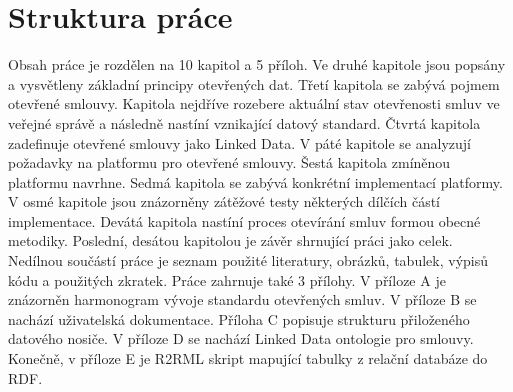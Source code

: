 \section{Struktura práce}

Obsah práce je rozdělen na 10 kapitol a 5 příloh. Ve druhé kapitole jsou popsány a vysvětleny základní principy otevřených dat. Třetí kapitola se zabývá pojmem otevřené smlouvy. Kapitola nejdříve rozebere aktuální stav otevřenosti smluv ve veřejné správě a následně nastíní vznikající datový standard. Čtvrtá kapitola zadefinuje otevřené smlouvy jako Linked Data. V páté kapitole se analyzují požadavky na platformu pro otevřené smlouvy. Šestá kapitola zmíněnou platformu navrhne. Sedmá kapitola se zabývá konkrétní implementací platformy. V osmé kapitole jsou znázorněny zátěžové testy některých dílčích částí implementace. Devátá kapitola nastíní proces otevírání smluv formou obecné metodiky. Poslední, desátou kapitolou je závěr shrnující práci jako celek. Nedílnou součástí práce je seznam použité literatury, obrázků, tabulek, výpisů kódu a použitých zkratek. Práce zahrnuje také 3 přílohy. V příloze A je znázorněn harmonogram vývoje standardu otevřených smluv. V příloze B se nachází uživatelská dokumentace. Příloha C popisuje strukturu přiloženého datového nosiče. V příloze D se nachází Linked Data ontologie pro smlouvy. Konečně, v příloze E je R2RML skript mapující tabulky z relační databáze do RDF.

